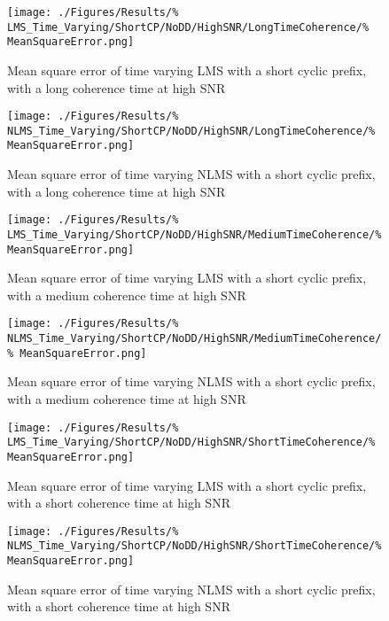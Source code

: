 \begin{figure}[ht]
	\centering
	\begin{minipage}{0.49\textwidth}
		\centering
		\texttt{[image: ./Figures/Results/\%
	LMS\_Time\_Varying/ShortCP/NoDD/HighSNR/LongTimeCoherence/\%
	MeanSquareError.png]}
		\captionsetup{width=0.75\linewidth}
		\caption{Mean square error of time varying LMS with a 
		short cyclic prefix, with a long coherence time at 
		high SNR}
	\end{minipage}
	\begin{minipage}{0.49\textwidth}
		\centering
		\texttt{[image: ./Figures/Results/\%
	NLMS\_Time\_Varying/ShortCP/NoDD/HighSNR/LongTimeCoherence/\%
	MeanSquareError.png]}
		\captionsetup{width=0.75\linewidth}
		\caption{Mean square error of time varying NLMS with 
		a short cyclic prefix, with a long coherence time at 
		high SNR}
	\end{minipage}
\end{figure}

\begin{figure}[ht]
	\centering
	\begin{minipage}{0.49\textwidth}
		\centering
		\texttt{[image: ./Figures/Results/\%
	LMS\_Time\_Varying/ShortCP/NoDD/HighSNR/MediumTimeCoherence/\%
	MeanSquareError.png]}
		\captionsetup{width=0.75\linewidth}
		\caption{Mean square error of time varying LMS with a 
		short cyclic prefix, with a medium coherence time at 
		high SNR}
	\end{minipage}
	\begin{minipage}{0.49\textwidth}
		\centering
		\texttt{[image: ./Figures/Results/\%
	NLMS\_Time\_Varying/ShortCP/NoDD/HighSNR/MediumTimeCoherence/\%
	MeanSquareError.png]}
		\captionsetup{width=0.75\linewidth}
		\caption{Mean square error of time varying NLMS with 
		a short cyclic prefix, with a medium coherence 
		time at high SNR}
	\end{minipage}
\end{figure}

\begin{figure}[ht]
	\centering
	\begin{minipage}{0.49\textwidth}
		\centering
		\texttt{[image: ./Figures/Results/\%
	LMS\_Time\_Varying/ShortCP/NoDD/HighSNR/ShortTimeCoherence/\%
	MeanSquareError.png]}
		\captionsetup{width=0.75\linewidth}
		\caption{Mean square error of time varying LMS with a 
		short cyclic prefix, with a short coherence time at 
		high SNR}
	\end{minipage}
	\begin{minipage}{0.49\textwidth}
		\centering
		\texttt{[image: ./Figures/Results/\%
	NLMS\_Time\_Varying/ShortCP/NoDD/HighSNR/ShortTimeCoherence/\%
	MeanSquareError.png]}
		\captionsetup{width=0.75\linewidth}
		\caption{Mean square error of time varying NLMS with 
		a short cyclic prefix, with a short coherence time 
		at high SNR}
	\end{minipage}
\end{figure}

